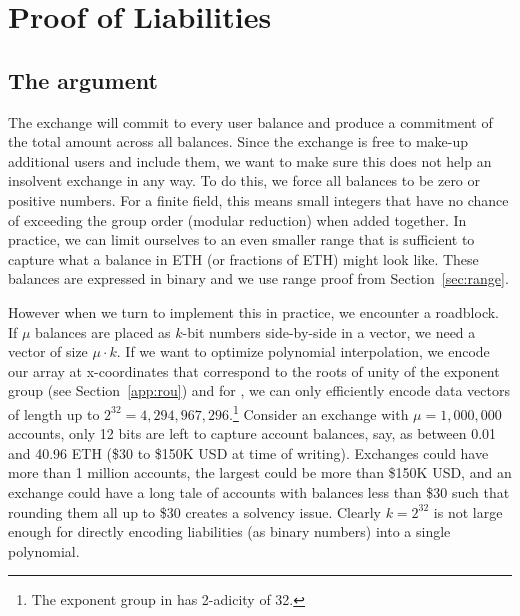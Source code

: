 \section{Proof of Liabilities}

\subsection{The \pol argument}
\label{sec:pol}

The exchange will commit to every user balance and produce a commitment of the total amount across all balances. Since the exchange is free to make-up additional users and include them, we want to make sure this does not help an insolvent exchange in any way. To do this, we force all balances to be zero or positive numbers. For a finite field, this means small integers that have no chance of exceeding the group order (modular reduction) when added together. In practice, we can limit ourselves to an even smaller range that is sufficient to capture what a balance in ETH (or fractions of ETH) might look like. These balances are expressed in binary and we use range proof from Section~\ref{sec:range}.

However when we turn to implement this in practice, we encounter a roadblock. If $\mu$ balances are placed as $k$-bit numbers side-by-side in a vector, we need a vector of size $\mu \cdot k$. If we want to optimize polynomial interpolation, we encode our array at x-coordinates that correspond to the roots of unity of the exponent group (see Section~\ref{app:rou}) and for \bls, we can only efficiently encode data vectors of length up to \(2^{32}=4,294,967,296\).\footnote{The exponent group in \bls has 2-adicity of 32.} Consider an exchange with $\mu=1,000,000$ accounts, only 12 bits are left to capture account balances, say, as between 0.01 and 40.96 ETH (\$30 to \$150K USD at time of writing). Exchanges could have more than 1 million accounts, the largest could be more than \$150K USD, and an exchange could have a long tale of accounts with balances less than \$30 such that rounding them all up to \$30 creates a solvency issue. Clearly \(k=2^{32}\) is not large enough for directly encoding liabilities (as binary numbers) into a single polynomial.

